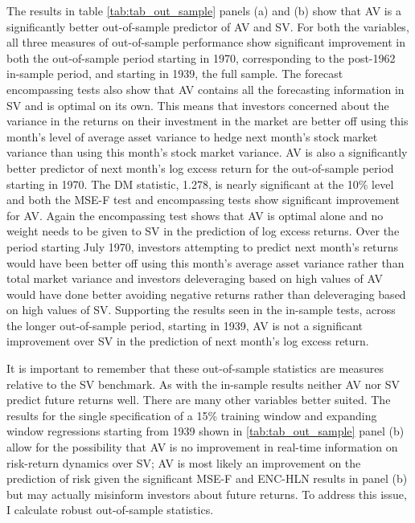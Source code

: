 The results in table \ref{tab:tab_out_sample} panels (a) and (b) show that AV is a significantly better out-of-sample predictor of AV and SV. For both the variables, all three measures of out-of-sample performance show significant improvement in both the out-of-sample period starting in 1970, corresponding to the post-1962 in-sample period, and starting in 1939, the full sample. The forecast encompassing tests also show that AV contains all the forecasting information in SV and is optimal on its own. This means that investors concerned about the variance in the returns on their investment in the market are better off using this month's level of average asset variance to hedge next month's stock market variance than using this month's stock market variance. AV is also a significantly better predictor of next month's log excess return for the out-of-sample period starting in 1970. The DM statistic, 1.278, is nearly significant at the 10\% level and both the MSE-F test and encompassing tests show significant improvement for AV. Again the encompassing test shows that AV is optimal alone and no weight needs to be given to SV in the prediction of log excess returns. Over the period starting July 1970, investors attempting to predict next month's returns would have been better off using this month's average asset variance rather than total market variance and investors deleveraging based on high values of AV would have done better avoiding negative returns rather than deleveraging based on high values of SV. Supporting the results seen in the in-sample tests, across the longer out-of-sample period, starting in 1939, AV is not a significant improvement over SV in the prediction of next month's log excess return. 

It is important to remember that these out-of-sample statistics are measures relative to the SV benchmark. As with the in-sample results neither AV nor SV predict future returns well. There are many other variables better suited. \citep{Campbell2008,Rapach2016,deuskar_margin_2017} The results for the single specification of a 15\% training window and expanding window regressions starting from 1939 shown in \ref{tab:tab_out_sample} panel (b) allow for the possibility that AV is no improvement in real-time information on risk-return dynamics over SV; AV is most likely an improvement on the prediction of risk given the significant MSE-F and ENC-HLN results in panel (b) but may actually misinform investors about future returns. To address this issue, I calculate robust out-of-sample statistics.

